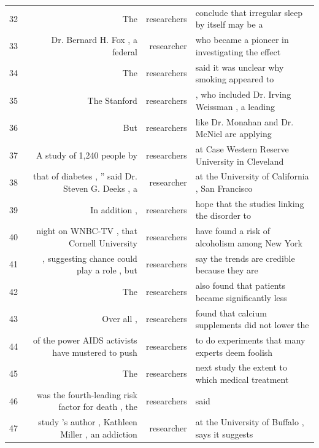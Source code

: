 {\begin{table}
\begin{tabular}{lrrl}
32 & The                                                & researchers & conclude that irregular sleep by itself may be a   \\
33 & Dr. Bernard H. Fox , a federal                     & researcher  & who became a pioneer in investigating the effect   \\
34 & The                                                & researchers & said it was unclear why smoking appeared to        \\
35 & The Stanford                                       & researchers & , who included Dr. Irving Weissman , a leading     \\
36 & But                                                & researchers & like Dr. Monahan and Dr. McNiel are applying       \\
37 & A study of 1,240 people by                         & researchers & at Case Western Reserve University in Cleveland    \\
38 & that of diabetes , '' said Dr. Steven G. Deeks , a & researcher  & at the University of California , San Francisco    \\
39 & In addition ,                                      & researchers & hope that the studies linking the disorder to      \\
40 & night on WNBC-TV , that Cornell University         & researchers & have found a risk of alcoholism among New York     \\
41 & , suggesting chance could play a role , but        & researchers & say the trends are credible because they are       \\
42 & The                                                & researchers & also found that patients became significantly less \\
43 & Over all ,                                         & researchers & found that calcium supplements did not lower the   \\
44 & of the power AIDS activists have mustered to push  & researchers & to do experiments that many experts deem foolish   \\
45 & The                                                & researchers & next study the extent to which medical treatment   \\
46 & was the fourth-leading risk factor for death , the & researchers & said                                               \\
47 & study 's author , Kathleen Miller , an addiction   & researcher  & at the University of Buffalo , says it suggests    \\

\end{tabular}
\end{table}}
